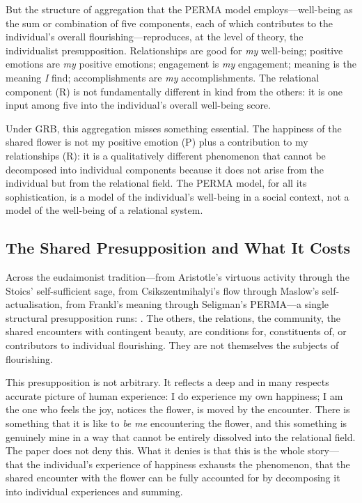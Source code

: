 But the structure of aggregation that the PERMA model employs---well-being as the sum or combination of five components, each of which contributes to the individual's overall flourishing---reproduces, at the level of theory, the individualist presupposition. Relationships are good for \emph{my} well-being; positive emotions are \emph{my} positive emotions; engagement is \emph{my} engagement; meaning is the meaning \emph{I} find; accomplishments are \emph{my} accomplishments. The relational component (R) is not fundamentally different in kind from the others: it is one input among five into the individual's overall well-being score.

Under GRB, this aggregation misses something essential. The happiness of the shared flower is not my positive emotion (P) plus a contribution to my relationships (R): it is a qualitatively different phenomenon that cannot be decomposed into individual components because it does not arise from the individual but from the relational field. The PERMA model, for all its sophistication, is a model of the individual's well-being in a social context, not a model of the well-being of a relational system.

\subsection{The Shared Presupposition and What It Costs}
\label{p14:subsec:eudaimdiagnosis}

\noindent
Across the eudaimonist tradition---from Aristotle's virtuous activity through the Stoics' self-sufficient sage, from Csikszentmihalyi's flow through Maslow's self-actualisation, from Frankl's meaning through Seligman's PERMA---a single structural presupposition runs: . The others, the relations, the community, the shared encounters with contingent beauty, are conditions for, constituents of, or contributors to individual flourishing. They are not themselves the subjects of flourishing.

This presupposition is not arbitrary. It reflects a deep and in many respects accurate picture of human experience: I do experience my own happiness; I am the one who feels the joy, notices the flower, is moved by the encounter. There is something that it is like to \emph{be me} encountering the flower, and this something is genuinely mine in a way that cannot be entirely dissolved into the relational field. The paper does not deny this. What it denies is that this is the whole story---that the individual's experience of happiness exhausts the phenomenon, that the shared encounter with the flower can be fully accounted for by decomposing it into individual experiences and summing.

